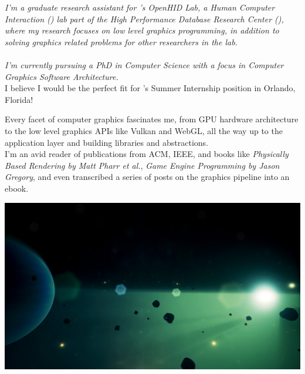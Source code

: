 \documentclass[10pt,a4paper]{article}
\begin{document}
\begin{multicols}{2}


\noindent \textit{I'm a graduate research assistant for 's OpenHID Lab, a Human Computer Interaction () lab part of the High Performance Database Research Center (), where my research focuses on low level graphics programming, in addition to solving graphics related problems for other researchers in the lab. \\ \\ I'm currently pursuing a PhD in Computer Science with a focus in Computer Graphics Software Architecture.} \\

I believe I would be the perfect fit for 's Summer Internship position in Orlando, Florida!


Every facet of computer graphics fascinates me, from GPU hardware architecture to the low level graphics APIs like Vulkan and WebGL, all the way up to the application layer and building libraries and abstractions. \\

I'm an avid reader of publications from ACM, IEEE, and books like \textit{Physically Based Rendering by Matt Pharr et al.}, \textit{Game Engine Programming by Jason Gregory}, and even transcribed a series of posts on the graphics pipeline into an ebook. 

\vspace{1.3em}

\noindent \includegraphics[width=\linewidth]{../portfolio/research/realtime-celestial-rendering/assets/cover.jpg}

\vspace{1.3em}


\end{multicols}
\end{document}
